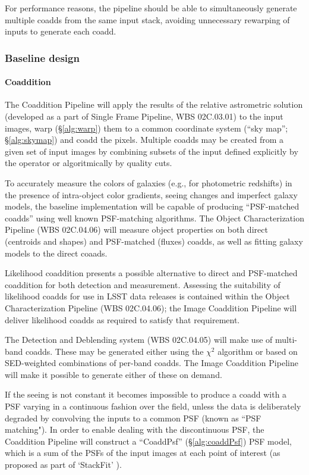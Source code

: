 \documentclass[12pt]{article}
\newcommand{\wbsSFM}{WBS 02C.03.01}
\newcommand{\wbsDetDeblend}{WBS 02C.04.05}
\newcommand{\wbsObjChar}{WBS 02C.04.06}
\begin{document}
For performance reasons, the pipeline should be able to simultaneously generate multiple coadds from the same input stack, avoiding unnecessary rewarping of inputs to generate each coadd.

\subsubsection{Baseline design}

\paragraph{Coaddition}
\label{alg:coadd}

The Coaddition Pipeline will apply the results of the relative astrometric solution (developed as a part of Single Frame Pipeline, \wbsSFM) to the input images, warp (\S\ref{alg:warp}) them to a common coordinate system (``sky map''; \S\ref{alg:skymap}) and coadd the pixels. Multiple coadds may be created from a given set of input images by combining subsets of the input defined explicitly by the operator or algoritmically by quality cuts.

To accurately measure the colors of galaxies (e.g., for photometric redshifts) in the presence of intra-object color gradients, seeing changes and imperfect galaxy models, the baseline implementation will be capable of producing ``PSF-matched coadds'' using well known PSF-matching algorithms. The Object Characterization Pipeline (\wbsObjChar) will measure object properties on both direct (centroids and shapes) and PSF-matched (fluxes) coadds, as well as fitting galaxy models to the direct coaads.

Likelihood coaddition presents a possible alternative to direct and PSF-matched coaddition for both detection and measurement. Assessing the suitability of likelihood coadds for use in LSST data releases is contained within the Object Characterization Pipeline (\wbsObjChar); the Image Coaddition Pipeline will deliver likelihood coadds as required to satisfy that requirement.

The Detection and Deblending system (\wbsDetDeblend) will make use of multi-band coadds. These may be generated either using the $\chi^2$ algorithm \cite{Szalay99} or based on SED-weighted combinations of per-band coadds. The Image Coaddition Pipeline will make it possible to generate either of these on demand.

If the seeing is not constant it becomes impossible to produce a coadd with a PSF varying in a continuous fashion over the field, unless the data is deliberately degraded by convolving the inputs to a common PSF (known as ``PSF matching").  In order to enable dealing with the discontinuous PSF, the Coaddition Pipeline will construct a ``CoaddPsf'' (\S\ref{alg:coaddPsf}) PSF model, which is a sum of the PSFs of the input images at each point of interest (as proposed as part of `StackFit' \cite{Jee13}).
\end{document}
